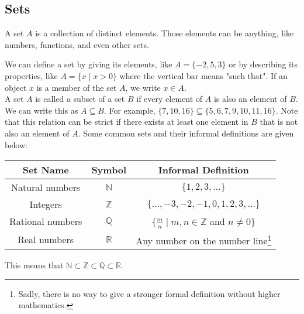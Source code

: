 \subsection{Sets}
\begin{definition}
	A set $A$ is a collection of distinct elements. Those elements can be anything, like numbers, functions, and even other sets.
\end{definition}
We can define a set by giving its elements, like $A = \{-2, 5, 3\}$ or by describing its properties, like $A = \{x \mid x > 0\}$ where the vertical bar means "such that".
If an object $x$ is a member of the set $A$, we write $x\in A$.\\


\noindent
A set $A$ is called a subset of a set $B$ if every element of $A$ is also an element of $B$. 
We can write this as $A \subseteq B$. 
For example, $\{7, 10, 16\} \subseteq \{5, 6, 7, 9, 10, 11, 16\}$. 
Note that this relation can be strict if there exists at least one element in $B$ that is not also an element of $A$. 
Some common sets and their informal definitions are given below:

\begin{table}[H]
	\centering
	\begin{tabular}{c|c|c}
		Set Name & Symbol & Informal Definition                                                                                                                         \\ \hline
		Natural numbers & $\mathbb{N}$ & $\{1, 2, 3, \dots\}$           						                                                                        \\
		Integers & $\mathbb{Z}$ & $\{\dots, -3, -2, -1, 0, 1, 2, 3, \dots\}$                                                                                            \\
		Rational numbers & $\mathbb{Q}$ & $\{\frac{m}{n} \mid m,n \in\mathbb{Z}$ and $n \neq 0\}$                                                                       \\
		Real numbers & $\mathbb{R}$ & Any number on the number line\footnote{Sadly, there is no way to give a stronger formal definition without higher mathematics.}   \\
	\end{tabular}
\end{table}

This means that $\mathbb{N} \subset \mathbb{Z} \subset \mathbb{Q} \subset \mathbb{R}$.\\


